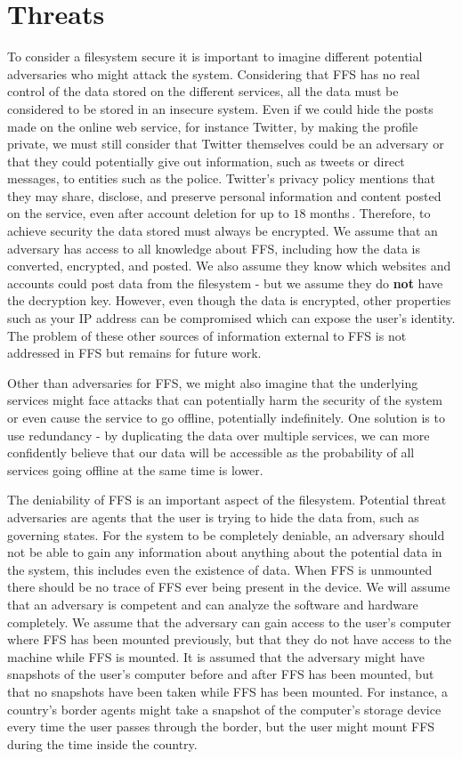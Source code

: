 \section{Threats}
To consider a filesystem secure it is important to imagine different potential adversaries who might attack the system. Considering that FFS has no real control of the data stored on the different services, all the data must be considered to be stored in an insecure system. Even if we could hide the posts made on the online web service, for instance Twitter, by making the profile private, we must still consider that Twitter themselves could be an adversary or that they could potentially give out information, such as tweets or direct messages, to entities such as the police. Twitter's privacy policy mentions that they may share, disclose, and preserve personal information and content posted on the service, even after account deletion for up to $18$ months\,\cite{TwitterPrivacyPolicy}. Therefore, to achieve security the data stored must always be encrypted. We assume that an adversary has access to all knowledge about FFS, including how the data is converted, encrypted, and posted. We also assume they know which websites and accounts could post data from the filesystem - but we assume they do \textbf{not} have the decryption key. However, even though the data is encrypted, other properties such as your IP address can be compromised which can expose the user's identity. The problem of these other sources of information external to FFS is not addressed in FFS but remains for future work.

Other than adversaries for FFS, we might also imagine that the underlying services might face attacks that can potentially harm the security of the system or even cause the service to go offline, potentially indefinitely. One solution is to use redundancy - by duplicating the data over multiple services, we can more confidently believe that our data will be accessible as the probability of all services going offline at the same time is lower.

The deniability of FFS is an important aspect of the filesystem. Potential threat adversaries are agents that the user is trying to hide the data from, such as governing states. For the system to be completely deniable, an adversary should not be able to gain any information about anything about the potential data in the system, this includes even the existence of data. When FFS is unmounted there should be no trace of FFS ever being present in the device. We will assume that an adversary is competent and can analyze the software and hardware completely. We assume that the adversary can gain access to the user's computer where FFS has been mounted previously, but that they do not have access to the machine while FFS is mounted. It is assumed that the adversary might have snapshots of the user's computer before and after FFS has been mounted, but that no snapshots have been taken while FFS has been mounted. For instance, a country's border agents might take a snapshot of the computer's storage device every time the user passes through the border, but the user might mount FFS during the time inside the country.